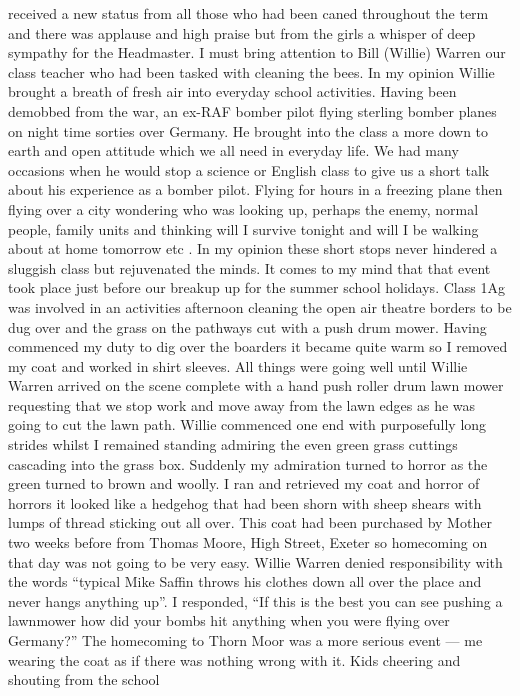 received a new status from all those who had been caned throughout the term and
there was applause and high praise but from the girls a whisper of deep
sympathy for the Headmaster. I must bring attention to Bill (Willie) Warren our
class teacher who had been tasked with cleaning the bees.  In my opinion Willie
brought a breath of fresh air into everyday school activities.  Having been
demobbed from the war, an ex-RAF bomber pilot flying sterling bomber planes on
night time sorties over Germany.  He brought into the class a more down to
earth and open attitude which we all need in everyday life. We had many
occasions when he would stop a science or English class to give us a short talk
about his experience as a bomber pilot.  Flying for hours in a freezing plane
then flying over a city wondering who was looking up, perhaps the enemy, normal
people, family units and thinking will I survive tonight and will I be walking
about at home tomorrow etc .  In my opinion these short stops never hindered a
sluggish class but rejuvenated the minds.   It comes to my mind that that event
took place just before our breakup up for the summer school holidays. Class 1Ag
was involved in an activities afternoon cleaning the open air theatre borders
to be dug over and the grass on the pathways cut with a push drum mower. Having
commenced my duty to dig over the boarders it became quite warm so I removed my
coat and worked in shirt sleeves.  All things were going well until Willie
Warren arrived on the scene complete with a hand push roller drum lawn mower
requesting that we stop work and move away from the lawn edges as he was going
to cut the lawn path.  Willie commenced one end with purposefully long strides
whilst I remained standing admiring the even green grass cuttings cascading
into the grass box.  Suddenly my admiration turned to horror as the green
turned to brown and woolly.  I ran and retrieved my coat and horror of horrors
it looked like a hedgehog that had been shorn with sheep shears with lumps of
thread sticking out all over.  This coat had been purchased by Mother two weeks
before from Thomas Moore, High Street, Exeter so homecoming on that day was not
going to be very easy. Willie Warren denied responsibility with the words
``typical Mike Saffin throws his clothes down all over the place and never
hangs anything up''.  I responded, ``If this is the best you can see pushing a
lawnmower how did your bombs hit anything when you were flying over Germany?''
The homecoming to Thorn Moor was a more serious event --- me wearing the coat as
if there was nothing wrong with it. Kids cheering and shouting from the school
